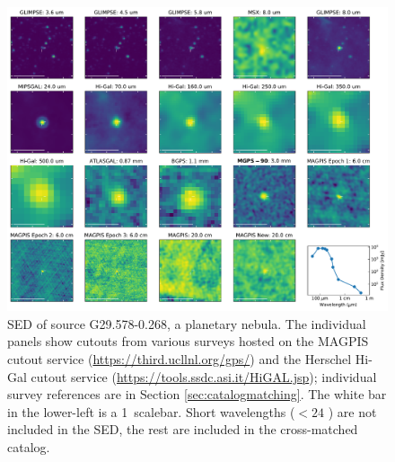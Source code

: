 \documentclass[twocolumn]{aastex62}
\begin{document}
\begin{figure}[htp]
\includegraphics[width=17cm]{figures/SED_plot_G29_G29.578-0.268.pdf}
\caption{SED of source G29.578-0.268, a planetary nebula.  The individual panels show cutouts from 
various surveys hosted on the MAGPIS cutout service
(\url{https://third.ucllnl.org/gps/}) and the Herschel Hi-Gal cutout service
(\url{https://tools.ssdc.asi.it/HiGAL.jsp}); individual survey references are in Section \ref{sec:catalogmatching}.
The white bar in the lower-left is a 1\arcmin\ scalebar.
Short wavelengths ($<24$ \um) are not included in the SED, the rest are included in the cross-matched catalog.
}
\label{fig:g29pn}
\end{figure}
\end{document}
